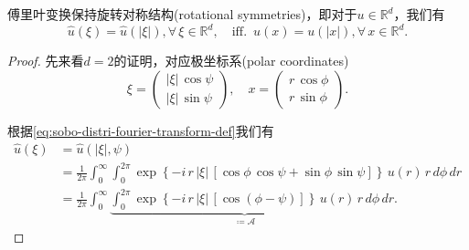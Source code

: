 \begin{lemma}[傅里叶变换的旋转对称]
  傅里叶变换保持旋转对称结构(rotational symmetries)，即对于$u \in \mathbb{R}^d$，我们有
  \begin{equation*}
    \widehat{u}(\xi) = \widehat{u}(\left| \xi \right|), \forall \, \xi \in \mathbb{R}^{d}, \quad \text{iff. } \, u(x) = u(\left| x \right|), \forall \, x \in \mathbb{R}^d.
  \end{equation*}
\end{lemma}
\begin{proof}
  先来看$d=2$的证明，对应极坐标系(polar coordinates)
  \begin{equation*}
    \xi = \begin{pmatrix}
    \left| \xi \right| \, \cos \psi \\
    \left| \xi \right| \, \sin \psi
    \end{pmatrix},
    \quad
    x = \begin{pmatrix}
    r \, \cos \phi \\
    r \, \sin \phi
    \end{pmatrix}.
  \end{equation*}

根据\eqref{eq:sobo-distri-fourier-transform-def}我们有
\begin{equation}
  \label{eq:sobo-fourier-transform-symmetry-2d-0}
\begin{split}
  \widehat{u} \left( \xi \right) &= \widehat{u}\left( \left| \xi \right|, \psi \right) \\
  &=\frac{1}{2\pi} \int_{0}^{\infty} \int_{0}^{2 \pi}
  \exp \left\{
  - i \, r \, \left| \xi \right| \,
  \left[
  \cos \phi \, \cos \psi + \sin \phi \, \sin \psi
  \right]
  \right\} \,
  u(r) \, r \, d \phi \, d r \\
  &=\frac{1}{2\pi} \int_{0}^{\infty} \underbrace{\int_{0}^{2 \pi}
  \exp \left\{
  - i \, r \, \left| \xi \right| \,
  \left[
  \cos \left( \phi - \psi \right)
  \right]
  \right\} \,
  u(r) \, r \, d \phi}_{\coloneqq \mathcal{A}} \, d r.
\end{split}
\end{equation}


\end{proof}
